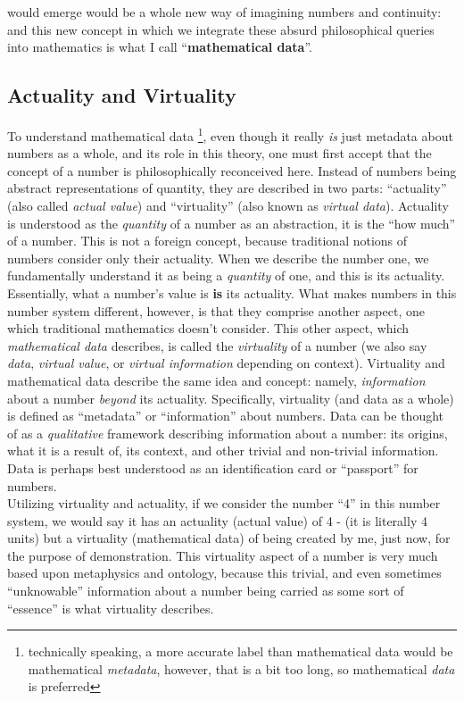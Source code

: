 \documentclass{article}
\begin{document}
would emerge would be a whole new way of imagining numbers and continuity: and this new concept in which we integrate these absurd philosophical queries into mathematics is what I call ``\textbf{mathematical data}''. 

\subsection{Actuality and Virtuality}To understand mathematical data \footnote{technically speaking, a more accurate label than mathematical data would be mathematical \textit{metadata}, however, that is a bit too long, so mathematical \textit{data} is preferred}, even though it really \textit{is} just metadata about numbers as a whole, and its role in this theory, one must first accept that the concept of a number is philosophically reconceived here. Instead of numbers being abstract representations of quantity, they are described in two parts: ``actuality'' (also called \textit{actual value}) and ``virtuality'' (also known as \textit{virtual data}).
Actuality is understood as the \textit{quantity} of a number as an abstraction, it is the ``how much'' of a number. This is not a foreign concept, because traditional notions of numbers consider only their actuality. When we describe the number one, we fundamentally understand it as being a \textit{quantity} of one, and this is its actuality. Essentially, what a number's value is \textbf{is} its actuality.
What makes numbers in this number system different, however, is that they comprise another aspect, one which traditional mathematics doesn't consider. This other aspect, which \textit{mathematical data} describes, is called the \textit{virtuality} of a number (we also say \textit{data}, \textit{virtual value}, or \textit{virtual information} depending on context). Virtuality and mathematical data describe the same idea and concept: namely, \textit{information} about a number \textit{beyond} its actuality. Specifically, virtuality (and data as a whole) is defined as ``metadata'' or ``information'' about numbers. Data can be thought of as a \textit{qualitative} framework describing information about a number: its origins, what it is a result of, its context, and other trivial and non-trivial information. Data is perhaps best understood as an identification card or ``passport'' for numbers.\\ Utilizing virtuality and actuality, if we consider  the number ``4'' in this number system, we would say it has an actuality (actual value) of 4 - (it is literally 4 units) but a virtuality (mathematical data) of being created by me, just now, for the purpose of demonstration. This virtuality aspect of a number is very much based upon metaphysics and ontology, because this trivial, and even sometimes ``unknowable'' information about a number being carried as some sort of ``essence'' is what virtuality describes.\\
\end{document}
